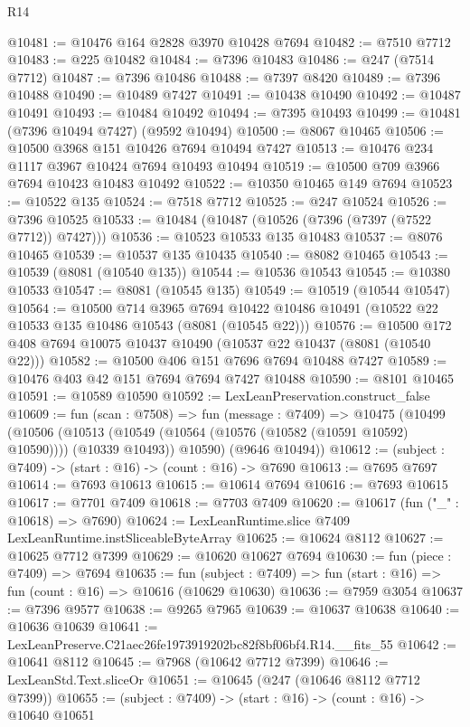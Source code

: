\begin{lexlean}{R14}
\begin{coremodule}
@10481 := @10476 @164 @2828 @3970 @10428 @7694
@10482 := @7510 @7712
@10483 := @225 @10482
@10484 := @7396 @10483
@10486 := @247 (@7514 @7712)
@10487 := @7396 @10486
@10488 := @7397 @8420
@10489 := @7396 @10488
@10490 := @10489 @7427
@10491 := @10438 @10490
@10492 := @10487 @10491
@10493 := @10484 @10492
@10494 := @7395 @10493
@10499 := @10481 (@7396 @10494 @7427) (@9592 @10494)
@10500 := @8067 @10465
@10506 := @10500 @3968 @151 @10426 @7694 @10494 @7427
@10513 := @10476 @234 @1117 @3967 @10424 @7694 @10493 @10494
@10519 := @10500 @709 @3966 @7694 @10423 @10483 @10492
@10522 := @10350 @10465 @149 @7694
@10523 := @10522 @135
@10524 := @7518 @7712
@10525 := @247 @10524
@10526 := @7396 @10525
@10533 := @10484 (@10487 (@10526 (@7396 (@7397 (@7522 @7712)) @7427)))
@10536 := @10523 @10533 @135 @10483
@10537 := @8076 @10465
@10539 := @10537 @135 @10435
@10540 := @8082 @10465
@10543 := @10539 (@8081 (@10540 @135))
@10544 := @10536 @10543
@10545 := @10380 @10533
@10547 := @8081 (@10545 @135)
@10549 := @10519 (@10544 @10547)
@10564 := @10500
    @714
    @3965
    @7694
    @10422
    @10486
    @10491
    (@10522 @22 @10533 @135 @10486 @10543 (@8081 (@10545 @22)))
@10576 := @10500 @172 @408 @7694 @10075 @10437 @10490 (@10537 @22 @10437 (@8081 (@10540 @22)))
@10582 := @10500 @406 @151 @7696 @7694 @10488 @7427
@10589 := @10476 @403 @42 @151 @7694 @7694 @7427 @10488
@10590 := @8101 @10465
@10591 := @10589 @10590
@10592 := LexLeanPreservation.construct_false
@10609 := fun (scan : @7508) =>
  fun (message : @7409) =>
  @10475
    (@10499
      (@10506
        (@10513 (@10549 (@10564 (@10576 (@10582 (@10591 @10592) @10590)))) (@10339 @10493))
        @10590)
      (@9646 @10494))
@10612 := (subject : @7409) -> (start : @16) -> (count : @16) -> @7690
@10613 := @7695 @7697
@10614 := @7693 @10613
@10615 := @10614 @7694
@10616 := @7693 @10615
@10617 := @7701 @7409
@10618 := @7703 @7409
@10620 := @10617 (fun ("_" : @10618) => @7690)
@10624 := LexLeanRuntime.slice @7409 LexLeanRuntime.instSliceableByteArray
@10625 := @10624 @8112
@10627 := @10625 @7712 @7399
@10629 := @10620 @10627 @7694
@10630 := fun (piece : @7409) => @7694
@10635 := fun (subject : @7409) => fun (start : @16) => fun (count : @16) => @10616 (@10629 @10630)
@10636 := @7959 @3054
@10637 := @7396 @9577
@10638 := @9265 @7965
@10639 := @10637 @10638
@10640 := @10636 @10639
@10641 := LexLeanPreserve.C21aec26fe1973919202bc82f8bf06bf4.R14.__fits_55
@10642 := @10641 @8112
@10645 := @7968 (@10642 @7712 @7399)
@10646 := LexLeanStd.Text.sliceOr
@10651 := @10645 (@247 (@10646 @8112 @7712 @7399))
@10655 := (subject : @7409) -> (start : @16) -> (count : @16) -> @10640 @10651

\end{coremodule}
\end{lexlean}
